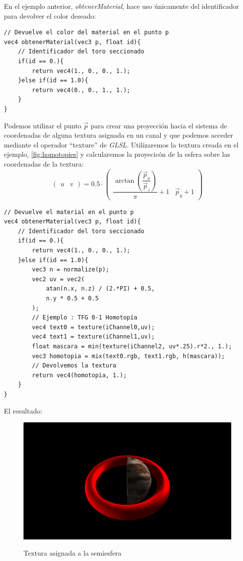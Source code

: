 En el ejemplo anterior, \textit{obtenerMaterial}, hace uso únicamente del identificador para devolver el color deseado:

\begin{lstlisting}
// Devuelve el color del material en el punto p
vec4 obtenerMaterial(vec3 p, float id){
    // Identificador del toro seccionado
    if(id == 0.){
        return vec4(1., 0., 0., 1.);
    }else if(id == 1.0){
        return vec4(0., 0., 1., 1.);
    }
}
\end{lstlisting}

Podemos utilizar el punto \(\Vec{p}\) para crear una proyección hacia el sistema de coordenadas de alguna textura asignada en un canal y que podemos acceder mediante el operador \enquote{texture} de \textit{GLSL}. Utilizaremos la textura creada en el ejemplo, \ref{fig:homotopies} y calcularemos la proyecicón de la esfera sobre las coordenadas de la textura:
\[\begin{pmatrix}
    u&
    v
\end{pmatrix}=  0.5\cdot
\begin{pmatrix}
    \dfrac{\arctan\left(\dfrac{\Vec{p}_x}{\Vec{p}_z}\right)}{\pi}+1&
    \Vec{p}_y + 1
\end{pmatrix}
\]

\begin{lstlisting}
// Devuelve el material en el punto p
vec4 obtenerMaterial(vec3 p, float id){
    // Identificador del toro seccionado
    if(id == 0.){
        return vec4(1., 0., 0., 1.);
    }else if(id == 1.0){
    	vec3 n = normalize(p);
        vec2 uv = vec2(
            atan(n.x, n.z) / (2.*PI) + 0.5,
            n.y * 0.5 + 0.5
        );
        // Ejemplo : TFG 0-1 Homotopía
        vec4 text0 = texture(iChannel0,uv);
        vec4 text1 = texture(iChannel1,uv);
        float mascara = min(texture(iChannel2, uv*.25).r*2., 1.);
        vec3 homotopia = mix(text0.rgb, text1.rgb, h(mascara));
        // Devolvemos la textura
        return vec4(homotopia, 1.);
    }
}
\end{lstlisting}

El resultado:

\begin{figure}[H]
  \centering
  \captionsetup{justification=centering}%
  \includegraphics[width=1.0\textwidth]{secciones/imagenes/material/textura.png}\label{fig:texture}
  \caption{Textura asignada a la semiesfera}
\end{figure}